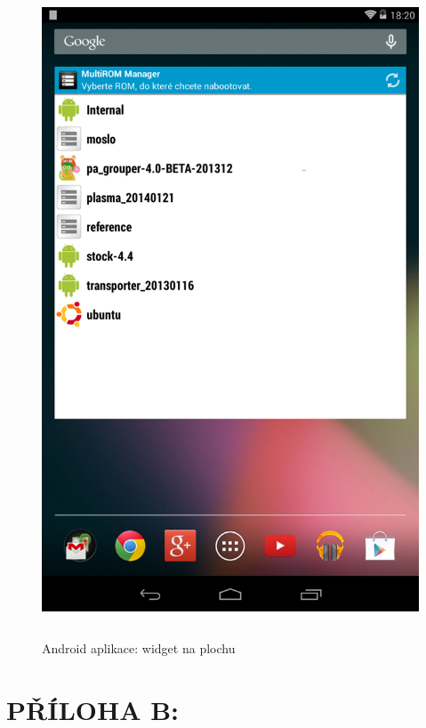 \documentclass[12pt, a4paper, oneside]{article}
\begin{document}
\begin{figure}[H]
\begin{center}
 \includegraphics[height=550pt]{../img/app_widget.png}
\caption{Android aplikace: widget na plochu}
\end{center}
\end{figure}

\newpage
\section*{PŘÍLOHA B:}
\printbibliography
\end{document}
